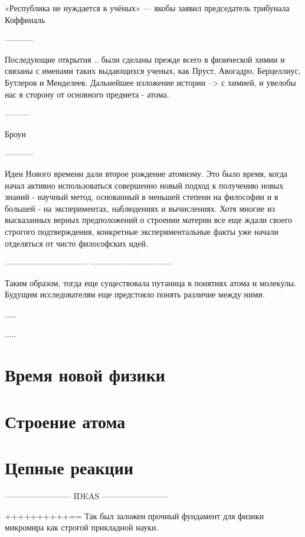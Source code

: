«Республика не нуждается в учёных» — якобы заявил председатель трибунала Коффиналь


-----------

Последующие открытия .. были сделаны прежде всего в физической химии и связаны с именами таких выдающихся ученых, как Пруст, Авогадро, Берцеллиус, Бутлеров и Менделеев. 
Дальнейшее изложение истории --> с химией, и увелобы нас в сторону от основного предмета - атома. 

---------

Броун


-----------

Идеи Нового времени дали второе рождение атомизму.
Это было время, когда начал активно использоваться совершенно новый подход к получению новых знаний - научный метод, основанный в меньшей степени на философии и в большей - на экспериментах, наблюдениях и вычислениях.
Хотя многие из высказанных верных предположений о строении материи все еще ждали своего строгого подтверждения, конкретные экспериментальные факты уже начали отделяться от чисто философских идей.


------------------------------
------------------------------


Таким образом, тогда еще существовала путаница в понятиях атома и молекулы.
Будущим исследователям еще предстояло понять различие между ними.


.....





.....






\section*{Время новой физики}


\section*{Строение атома}


\section*{Цепные реакции}


------------------------ IDEAS ------------------------ 

++++++++++==
Так был заложен прочный фундамент для физики микромира как строгой прикладной науки. 


